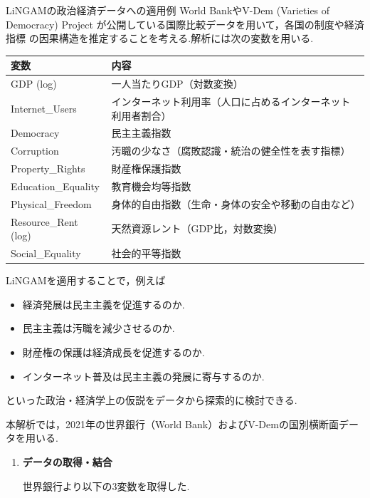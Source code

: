 \documentclass[uplatex, dvipdfmx]{jsarticle}
\begin{document}
\begin{exm}{LiNGAMの政治経済データへの適用例}
  World BankやV-Dem (Varieties of Democracy) Project
  が公開している国際比較データを用いて，各国の制度や経済指標
  の因果構造を推定することを考える.解析には次の変数を用いる.

  \begin{center}
    \begin{tabular}{ll}
    \hline
    変数 & 内容\\
    \hline
    GDP (log) & 一人当たりGDP（対数変換）\\
    Internet\_Users & インターネット利用率（人口に占めるインターネット利用者割合）\\
    Democracy & 民主主義指数\\
    Corruption & 汚職の少なさ（腐敗認識・統治の健全性を表す指標）\\
    Property\_Rights & 財産権保護指数\\
    Education\_Equality & 教育機会均等指数\\
    Physical\_Freedom & 身体的自由指数（生命・身体の安全や移動の自由など）\\
    Resource\_Rent (log) & 天然資源レント（GDP比，対数変換）\\
    Social\_Equality & 社会的平等指数\\
    \hline
    \end{tabular}
  \end{center}

  LiNGAMを適用することで，例えば

  \begin{itemize}
    \item 経済発展は民主主義を促進するのか.
    \item 民主主義は汚職を減少させるのか.
    \item 財産権の保護は経済成長を促進するのか.
    \item インターネット普及は民主主義の発展に寄与するのか.
  \end{itemize}

  といった政治・経済学上の仮説をデータから探索的に検討できる.

  \noindent {}

  本解析では，2021年の世界銀行（World Bank）およびV-Demの国別横断面データを用いる.

  \begin{enumerate}
    \item \textbf{データの取得・結合}

    世界銀行より以下の3変数を取得した.


\end{enumerate}
\end{exm}
\end{document}
